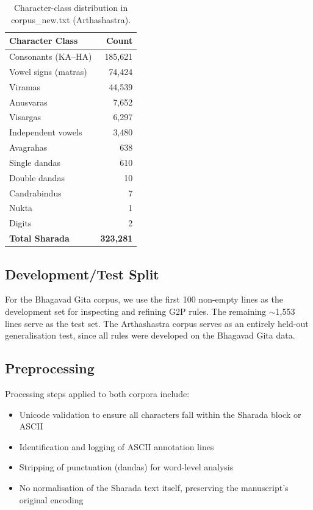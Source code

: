 \documentclass[11pt]{article}
\begin{document}
\begin{table}[t]
\centering
\small
\begin{tabular}{lr}
\toprule
\textbf{Character Class} & \textbf{Count} \\
\midrule
Consonants (KA--HA) & 185,621 \\
Vowel signs (matras) & 74,424 \\
Viramas & 44,539 \\
Anusvaras & 7,652 \\
Visargas & 6,297 \\
Independent vowels & 3,480 \\
Avagrahas & 638 \\
Single dandas & 610 \\
Double dandas & 10 \\
Candrabindus & 7 \\
Nukta & 1 \\
Digits & 2 \\
\midrule
\textbf{Total Sharada} & \textbf{323,281} \\
\bottomrule
\end{tabular}
\caption{Character-class distribution in corpus\_new.txt (Arthashastra).}
\label{tab:charbreakdown}
\end{table}

\subsection{Development/Test Split}
For the Bhagavad Gita corpus, we use the first 100 non-empty lines as the development set for inspecting and refining G2P rules. The remaining $\sim$1,553 lines serve as the test set. The Arthashastra corpus serves as an entirely held-out generalisation test, since all rules were developed on the Bhagavad Gita data.

\subsection{Preprocessing}
Processing steps applied to both corpora include:
\begin{itemize}
    \item Unicode validation to ensure all characters fall within the Sharada block or ASCII
    \item Identification and logging of ASCII annotation lines
    \item Stripping of punctuation (dandas) for word-level analysis
    \item No normalisation of the Sharada text itself, preserving the manuscript's original encoding
\end{itemize}
\end{document}
